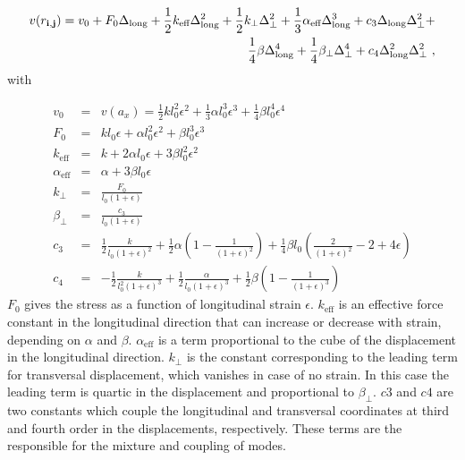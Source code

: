 \documentclass[12pt]{article}
\begin{document}
\begin{equation} \label{PotFPUExpanded}
\begin{split}
v(r_{\bf{i,j}}) = v_0 + F_0 \Delta_{\text{long}} + \frac{1}{2} k_{\text{eff}} \Delta^2_{\text{long}} + \frac{1}{2} k_{\perp} \Delta^2_{\perp} + \frac{1}{3} \alpha_{\text{eff}} \Delta^3_{\text{long}} + c_3  \Delta_{\text{long}} \Delta^2_{\perp} + \\
\frac{1}{4} \beta  \Delta^4_{\text{long}} +  \frac{1}{4} \beta_{\perp} \Delta^4_{\perp}  + c_4 \Delta^2_{\text{long}} \Delta^2_{\perp} \ ,
\end{split}
\end{equation}
with

\begin{eqnarray} \label{EffConstants}
v_0 &=& v(a_x) =  \frac{1}{2} k l_0^2 \epsilon^2 + \frac{1}{3} \alpha  l_0^3 \epsilon^3 + \frac{1}{4} \beta  l_0^4 \epsilon^4 \nonumber \\
F_0 &=&  k l_0  \epsilon + \alpha l_0^2 \epsilon^2 + \beta l_0^3 \epsilon^3 \nonumber \\ 
k_{\text{eff}} &=& k + 2 \alpha l_0 \epsilon + 3 \beta l_0^2 \epsilon^2 \nonumber \\ 
\alpha_{\text{eff}} &=& \alpha + 3 \beta l_0 \epsilon \nonumber \\
k_{\perp} &=& \frac{F_0}{l_0 (1 + \epsilon)} \nonumber \\ 
\beta_{\perp} &=& \frac{c_3}{l_0 (1 + \epsilon)} \nonumber \\  
c_3 &=& \frac{1}{2} \frac{k}{l_0 (1 + \epsilon)^2} + \frac{1}{2} \alpha \left( 1 - \frac{1}{(1 + \epsilon)^2} \right) + \frac{1}{4} \beta l_0 \left( \frac{2}{(1 + \epsilon)^2} - 2 + 4 \epsilon \right) \nonumber \\ 
c_4 &=&  - \frac{1}{2} \frac{k}{ l_0^2 (1 + \epsilon)^3} + \frac{1}{2} \frac{ \alpha }{ l_0 (1 + \epsilon)^3} + \frac{1}{2} \beta  \left( 1 - \frac{1}{(1 + \epsilon)^3} \right)
\end{eqnarray}
$F_0$ gives the stress as a function of longitudinal strain $\epsilon$. $k_{\text{eff}}$ is an effective force constant in the longitudinal direction that can increase or decrease with strain, depending on $\alpha$ and $\beta$. $\alpha_{\text{eff}}$ is a term proportional to the cube of the displacement in the longitudinal direction. $k_{\bot}$ is the constant corresponding to the leading term for transversal displacement, which vanishes in case of no strain. In this case the leading term is quartic in the displacement and proportional to $\beta_{\bot}$. $c3$ and $c4$ are two constants which couple the longitudinal and transversal coordinates at third and fourth order in the displacements, respectively. These terms are the responsible for the mixture and coupling of modes.
\end{document}
